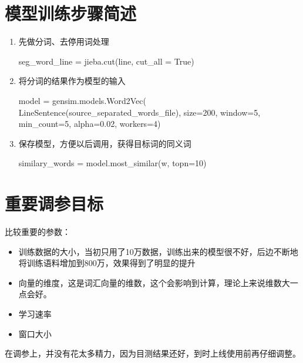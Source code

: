 \section{模型训练步骤简述}
\begin{enumerate}
    \item 先做分词、去停用词处理
    \begin{python}
        seg_word_line = jieba.cut(line, cut_all = True)
    \end{python}
    \item 将分词的结果作为模型的输入
    \begin{python}
        model = gensim.models.Word2Vec(
            LineSentence(source_separated_words_file), 
            size=200, window=5, min_count=5, alpha=0.02, 
            workers=4)
    \end{python}
    \item 保存模型，方便以后调用，获得目标词的同义词
    \begin{python}
        similary_words = model.most_similar(w, topn=10)
    \end{python}
\end{enumerate}

\section{重要调参目标}

比较重要的参数：
\begin{itemize}
    \item 训练数据的大小，当初只用了10万数据，训练出来的模型很不好，后边不断地将训练语料增加到800万，效果得到了明显的提升
    \item 向量的维度，这是词汇向量的维数，这个会影响到计算，理论上来说维数大一点会好。
    \item 学习速率
    \item 窗口大小
\end{itemize}

在调参上，并没有花太多精力，因为目测结果还好，到时上线使用前再仔细调整。

